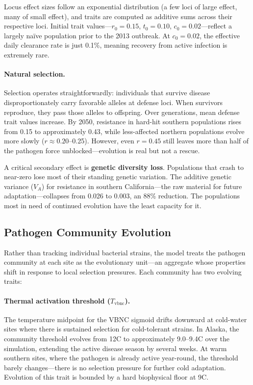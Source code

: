 Locus effect sizes follow an exponential distribution (a few loci of large
effect, many of small effect), and traits are computed as additive sums
across their respective loci.  Initial trait values---$r_0 = 0.15$,
$t_0 = 0.10$, $c_0 = 0.02$---reflect a largely na\"ive population prior to
the 2013 outbreak.  At $c_0 = 0.02$, the effective daily clearance rate is
just 0.1\%, meaning recovery from active infection is extremely rare.

\paragraph{Natural selection.}
Selection operates straightforwardly: individuals that survive disease
disproportionately carry favorable alleles at defense loci.  When survivors
reproduce, they pass those alleles to offspring.  Over generations, mean
defense trait values increase.  By 2050, resistance in hard-hit southern
populations rises from 0.15 to approximately 0.43, while
less-affected northern populations evolve more slowly ($r \approx 0.20$--0.25).
However, even $r = 0.45$ still leaves more than half of the pathogen force
unblocked---evolution is real but not a rescue.

A critical secondary effect is \textbf{genetic diversity loss}.  Populations
that crash to near-zero lose most of their standing genetic variation.
The additive genetic variance ($V_A$) for resistance in southern
California---the raw material for future adaptation---collapses from
0.026 to 0.003, an 88\% reduction.  The populations most in need of
continued evolution have the least capacity for it.

\subsection{Pathogen Community Evolution}
\label{sec:pathogen_evo_model}

Rather than tracking individual bacterial strains, the model treats the
pathogen community at each site as the evolutionary unit---an aggregate
whose properties shift in response to local selection pressures.  Each
community has two evolving traits:

\paragraph{Thermal activation threshold ($T_\mathrm{vbnc}$).}
The temperature midpoint for the VBNC sigmoid drifts downward at cold-water
sites where there is sustained selection for cold-tolerant strains.  In
Alaska, the community threshold evolves from 12\textdegree C to approximately
9.0--9.4\textdegree C over the simulation, extending the active disease
season by several weeks.  At warm southern sites, where the pathogen is
already active year-round, the threshold barely changes---there is no
selection pressure for further cold adaptation.  Evolution of this trait is
bounded by a hard biophysical floor at 9\textdegree C.

